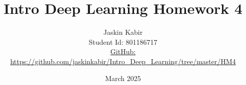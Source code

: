 \centering

\title{\Huge Intro Deep Learning Homework 4}

\author{ \huge
Jaskin Kabir \\
\Large Student Id: 801186717 \\
\Large \href{https://github.com/jaskinkabir/Intro_Deep_Learning/tree/master/HM3}{GitHub:}\\\url{https://github.com/jaskinkabir/Intro_Deep_Learning/tree/master/HM4}
}

\date{March 2025}

\begin{titlingpage}
\maketitle
\end{titlingpage}